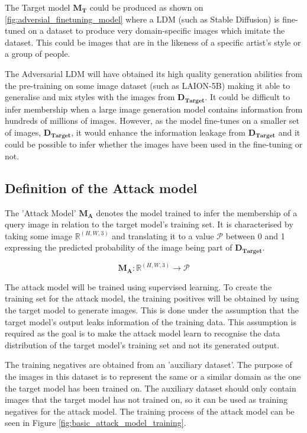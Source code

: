 
The Target model $\mathbf{M_T}$ could be produced as shown on \cref{fig:adversial_finetuning_model} where a LDM (such as Stable Diffusion) is fine-tuned on a dataset to produce very domain-specific images which imitate the dataset. This could be images that are in the likeness of a specific artist's style or a group of people.

The Adversarial LDM will have obtained its high quality generation abilities from the pre-training on some image dataset (such as LAION-5B) making it able to generalise and mix styles with the images from $\mathbf{D_{Target}}$. It could be difficult to infer membership when a large image generation model contains information from hundreds of millions of images. However, as the model fine-tunes on a smaller set of images, $\mathbf{D_{Target}}$, it would enhance the information leakage from $\mathbf{D_{Target}}$ and it could be possible to infer whether the images have been used in the fine-tuning or not. 

\subsection{Definition of the Attack model}\label{sec:intro_def_attack_model}
The 'Attack Model' $\mathbf{M_A}$  denotes the model trained to infer the membership of a query image in relation to the target model's training set. It is characterised by taking some image $\mathbb{R}^{(H,W,3)}$ and translating it to a value $\mathcal{P}$ between 0 and 1 expressing the predicted probability of the image being part of $\mathbf{D_{Target}}$.

\begin{equation}
    \mathbf{M_A} : \mathbb{R}^{(H,W,3)} \rightarrow \mathcal{P}
\end{equation}

The attack model will be trained using supervised learning. To create the training set for the attack model, the training positives will be obtained by using the target model to generate images. This is done under the assumption that the target model's output leaks information of the training data. This assumption is required as the goal is to make the attack model learn to recognise the data distribution of the target model's training set and not its generated output.



The training negatives are obtained from an 'auxiliary dataset'. The purpose of the images in this dataset is to represent the same or a similar domain as the one the target model has been trained on. The auxiliary dataset should only contain images that the target model has not trained on, so it can be used as training negatives for the attack model. The training process of the attack model can be seen in Figure \ref{fig:basic_attack_model_training}.
